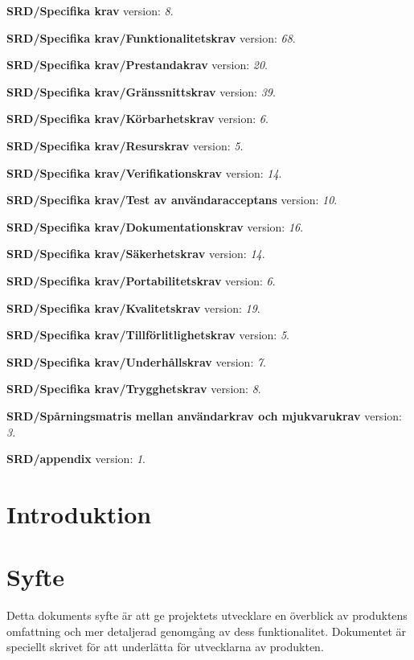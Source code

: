 \documentclass[a4paper, twoside, 11pt, titlepage]{article}
\begin{document}
\textbf{SRD/Specifika krav} version: \emph{8}.

\textbf{SRD/Specifika krav/Funktionalitetskrav} version: \emph{68}.

\textbf{SRD/Specifika krav/Prestandakrav} version: \emph{20}.

\textbf{SRD/Specifika krav/Gränssnittskrav} version: \emph{39}.

\textbf{SRD/Specifika krav/Körbarhetskrav} version: \emph{6}.

\textbf{SRD/Specifika krav/Resurskrav} version: \emph{5}.

\textbf{SRD/Specifika krav/Verifikationskrav} version: \emph{14}.

\textbf{SRD/Specifika krav/Test av användaracceptans} version: \emph{10}.

\textbf{SRD/Specifika krav/Dokumentationskrav} version: \emph{16}.

\textbf{SRD/Specifika krav/Säkerhetskrav} version: \emph{14}.

\textbf{SRD/Specifika krav/Portabilitetskrav} version: \emph{6}.

\textbf{SRD/Specifika krav/Kvalitetskrav} version: \emph{19}.

\textbf{SRD/Specifika krav/Tillförlitlighetskrav} version: \emph{5}.

\textbf{SRD/Specifika krav/Underhållskrav} version: \emph{7}.

\textbf{SRD/Specifika krav/Trygghetskrav} version: \emph{8}.

\textbf{SRD/Spårningsmatris mellan användarkrav och mjukvarukrav} version: \emph{3}.

\textbf{SRD/appendix} version: \emph{1}.

\clearpage \tableofcontents \clearpage

\clearpage
\section{Introduktion}



\clearpage
\section{Syfte}


Detta dokuments syfte är att ge projektets utvecklare en överblick av produktens omfattning och mer detaljerad genomgång av dess funktionalitet. Dokumentet är speciellt skrivet för att underlätta för utvecklarna av produkten. 
\end{document}
